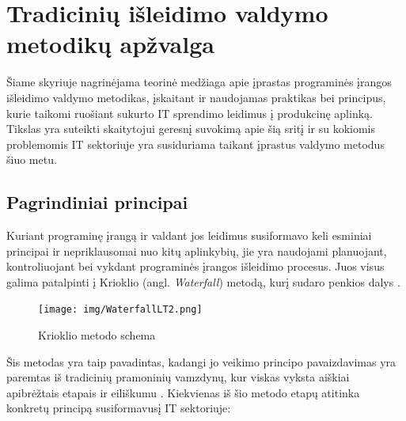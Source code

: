 \documentclass{VUMIFPSkursinis}
\begin{document}




\section{Tradicinių išleidimo valdymo metodikų apžvalga}
Šiame skyriuje nagrinėjama teorinė medžiaga apie įprastas programinės įrangos išleidimo valdymo metodikas, įskaitant ir naudojamas praktikas bei principus, kurie taikomi ruošiant sukurto IT sprendimo leidimus į produkcinę aplinką. Tikslas yra suteikti skaitytojui geresnį suvokimą apie šią sritį ir su kokiomis problemomis IT sektoriuje yra susiduriama taikant įprastus valdymo metodus šiuo metu.

\subsection{Pagrindiniai principai}
Kuriant programinę įrangą ir valdant jos leidimus susiformavo keli esminiai principai ir nepriklausomai nuo kitų aplinkybių, jie yra naudojami planuojant, kontroliuojant bei vykdant programinės įrangos išleidimo procesus. Juos visus galima patalpinti į Krioklio (angl. \textit{Waterfall}) metodą, kurį sudaro penkios dalys \cite{SaltTrecias}.

\begin{figure}[H]
    \centering
    \texttt{[image: img/WaterfallLT2.png]}
    \caption{Krioklio metodo schema}
    \label{img:mlp}
\end{figure}

Šis metodas yra taip pavadintas, kadangi jo veikimo principo pavaizdavimas yra paremtas iš tradicinių pramoninių vamzdynų, kur viskas vyksta aiškiai apibrėžtais etapais ir eiliškumu \cite{SaltTrecias}. Kiekvienas iš šio metodo etapų atitinka konkretų principą susiformavusį IT sektoriuje:
\end{document}
